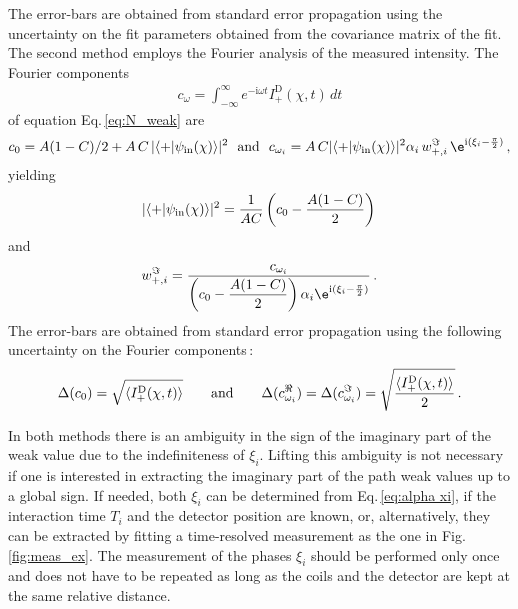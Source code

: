 \documentclass[12pt]{iopart}
\newcommand{\fig}{Fig.}
\newcommand{\eq}{Eq.}
\newcommand{\I}{\mathrm{i}}
\begin{document}
The error-bars are obtained from standard error propagation using the uncertainty on the fit parameters obtained from the covariance matrix of the fit. The second method employs the Fourier analysis of the measured intensity. The Fourier components
\begin{align}
    c_\omega= \int_{-\infty}^{\infty} e^{-\I \omega t}  I^{\mathrm{D}}_+(\chi, t) \, dt\label{eq:cw}
\end{align}
of equation \eq\,\eqref{eq:N_weak} are
\begin{align}
            c_0=A(1-C)/2 + A \, C \, \lvert\braket{+|\psi_\mathrm{in}(\chi)}\rvert^2 \ \ \mathrm{and} \ \
            c_{\omega_i}= A\, C \lvert\braket{+|\psi_\mathrm{in}(\chi)}\rvert^2 \alpha_i\,w^\Im_{+,i} \, \e^{\I (\xi_i-\frac{\pi}{2})} \, ,
\end{align}
yielding
\begin{align}
    \lvert\braket{+|\psi_\mathrm{in}(\chi)}\rvert^2 =\frac{1}{AC} \left(c_0-\dfrac{A(1-C)}{2}\right) \, 
\label{eq:cos2_Fourier}
\end{align}
and
\begin{align}
    w^\Im_{+,i} = \frac{c_{\omega_i}}{\left(c_0-\dfrac{A(1-C)}{2}\right)\alpha_i \e^{\I (\xi_i-\frac{\pi}{2})}} \, .
\label{eq:Im_Fourier}
\end{align}
The error-bars are obtained from standard error propagation using the following uncertainty on the Fourier components\,\cite{sulyok2011}:
\begin{align}
    \Delta(c_0) = \sqrt{\braket{I^{\mathrm{D}}_+(\chi, t)}} \qquad \mathrm{and} \qquad \Delta(c_{\omega_i}^\Re) = \Delta(c_{\omega_i}^\Im) = \sqrt{\frac{\braket{I^{\mathrm{D}}_+(\chi, t)}}{2}}\, . \label{eq:error_fourier}
\end{align}

In both methods there is an ambiguity in the sign of the imaginary part of the weak value due to the indefiniteness of $\xi_i$. Lifting this ambiguity is not necessary if one is interested in extracting the imaginary part of the path weak values up to a global sign. If needed, both $\xi_i$ can be determined from \eq\,\eqref{eq:alpha xi}, if the interaction time $T_i$ and the detector position are known, or, alternatively, they can be extracted by fitting a time-resolved measurement as the one in \fig\,\ref{fig:meas_ex}. The measurement of the phases $\xi_i$ should be performed only once and does not have to be repeated as long as the coils and the detector are kept at the same relative distance.
\end{document}
